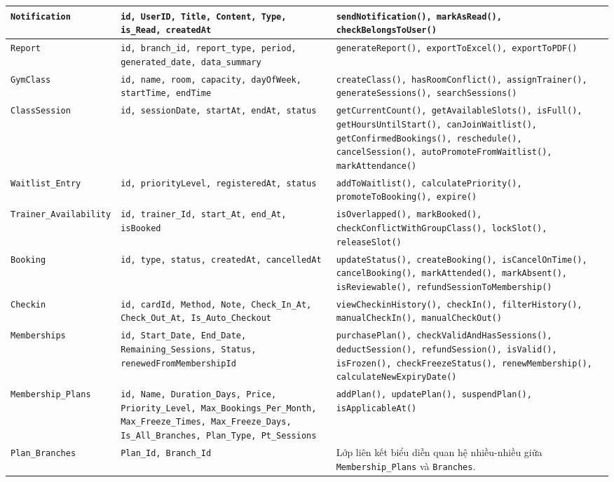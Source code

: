 \documentclass[a4paper,12pt]{article}
\begin{document}
{\begin{longtable}{|L{3.4cm}|L{5.3cm}|L{6.5cm}|}
\texttt{Notification} & \texttt{id, UserID, Title, Content, Type, is\_Read, createdAt} & \texttt{sendNotification(), markAsRead(), checkBelongsToUser()} \\ \hline
\texttt{Report} & \texttt{id, branch\_id, report\_type, period, generated\_date, data\_summary} & \texttt{generateReport(), exportToExcel(), exportToPDF()} \\ \hline
\texttt{GymClass} & \texttt{id, name, room, capacity, dayOfWeek, startTime, endTime} & \texttt{createClass(), hasRoomConflict(), assignTrainer(), generateSessions(), searchSessions()} \\ \hline
\texttt{ClassSession} & \texttt{id, sessionDate, startAt, endAt, status} & \texttt{getCurrentCount(), getAvailableSlots(), isFull(), getHoursUntilStart(), canJoinWaitlist(), getConfirmedBookings(), reschedule(), cancelSession(), autoPromoteFromWaitlist(), markAttendance()} \\ \hline
\texttt{Waitlist\_Entry} & \texttt{id, priorityLevel, registeredAt, status} & \texttt{addToWaitlist(), calculatePriority(), promoteToBooking(), expire()} \\ \hline
\texttt{Trainer\_Availability} & \texttt{id, trainer\_Id, start\_At, end\_At, isBooked} & \texttt{isOverlapped(), markBooked(), checkConflictWithGroupClass(), lockSlot(), releaseSlot()} \\ \hline
\texttt{Booking} & \texttt{id, type, status, createdAt, cancelledAt} & \texttt{updateStatus(), createBooking(), isCancelOnTime(), cancelBooking(), markAttended(), markAbsent(), isReviewable(), refundSessionToMembership()} \\ \hline
\texttt{Checkin} & \texttt{id, cardId, Method, Note, Check\_In\_At, Check\_Out\_At, Is\_Auto\_Checkout} & \texttt{viewCheckinHistory(), checkIn(), filterHistory(), manualCheckIn(), manualCheckOut()} \\ \hline
\texttt{Memberships} & \texttt{id, Start\_Date, End\_Date, Remaining\_Sessions, Status, renewedFromMembershipId} & \texttt{purchasePlan(), checkValidAndHasSessions(), deductSession(), refundSession(), isValid(), isFrozen(), checkFreezeStatus(), renewMembership(), calculateNewExpiryDate()} \\ \hline
\texttt{Membership\_Plans} & \texttt{id, Name, Duration\_Days, Price, Priority\_Level, Max\_Bookings\_Per\_Month, Max\_Freeze\_Times, Max\_Freeze\_Days, Is\_All\_Branches, Plan\_Type, Pt\_Sessions} & \texttt{addPlan(), updatePlan(), suspendPlan(), isApplicableAt()} \\ \hline
\texttt{Plan\_Branches} & \texttt{Plan\_Id, Branch\_Id} & Lớp liên kết biểu diễn quan hệ nhiều-nhiều giữa \texttt{Membership\_Plans} và \texttt{Branches}. \\ \hline

\end{longtable}}
\end{document}
